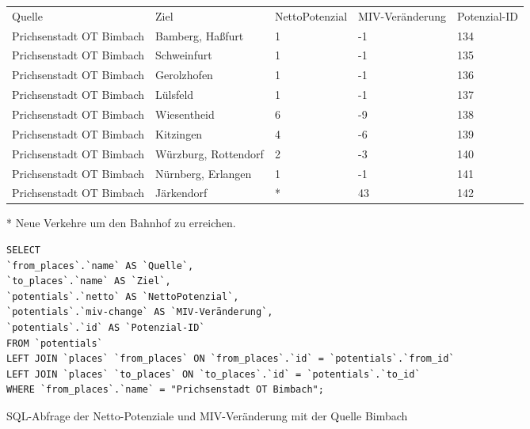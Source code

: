 \begin{tabularx}{\textwidth}{*5{X}}
Quelle & Ziel & NettoPotenzial & MIV-Veränderung & Potenzial-ID\\ 
Prichsenstadt OT Bimbach & Bamberg, Haßfurt & 1 & -1 & 134\\ 
Prichsenstadt OT Bimbach & Schweinfurt & 1 & -1 & 135\\ 
Prichsenstadt OT Bimbach & Gerolzhofen & 1 & -1 & 136\\ 
Prichsenstadt OT Bimbach & Lülsfeld & 1 & -1 & 137\\ 
Prichsenstadt OT Bimbach & Wiesentheid & 6 & -9 & 138\\ 
Prichsenstadt OT Bimbach & Kitzingen & 4 & -6 & 139\\ 
Prichsenstadt OT Bimbach & Würzburg, Rottendorf & 2 & -3 & 140\\ 
Prichsenstadt OT Bimbach & Nürnberg, Erlangen & 1 & -1 & 141\\ 
Prichsenstadt OT Bimbach & Järkendorf & * & 43 & 142\\ 
\end{tabularx}
\newline
\newline
* Neue Verkehre um den Bahnhof zu erreichen.
\newline
\begin{listing}[htbp]
\begin{verbatim}
SELECT
`from_places`.`name` AS `Quelle`, 
`to_places`.`name` AS `Ziel`, 
`potentials`.`netto` AS `NettoPotenzial`, 
`potentials`.`miv-change` AS `MIV-Veränderung`, 
`potentials`.`id` AS `Potenzial-ID`
FROM `potentials`
LEFT JOIN `places` `from_places` ON `from_places`.`id` = `potentials`.`from_id`
LEFT JOIN `places` `to_places` ON `to_places`.`id` = `potentials`.`to_id`
WHERE `from_places`.`name` = "Prichsenstadt OT Bimbach";
\end{verbatim}
\caption{SQL-Abfrage der Netto-Potenziale und MIV-Veränderung mit der Quelle Bimbach}\label{lst-fz-bimbach}
\end{listing}